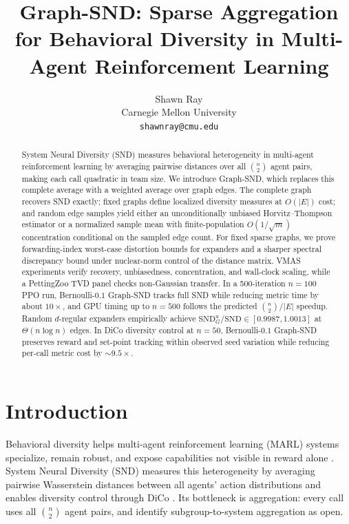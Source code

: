 \documentclass{article}
\title{Graph-SND: Sparse Aggregation for Behavioral Diversity in
Multi-Agent Reinforcement Learning}
\author{%
  Shawn Ray \\
  Carnegie Mellon University \\
  \texttt{shawnray@cmu.edu} \\
}
\theoremstyle{plain}
\theoremstyle{definition}
\theoremstyle{remark}
\newcommand{\SND}{\ensuremath{\mathrm{SND}}}
\newcommand{\SNDG}{\mathrm{SND}_{G}}
\begin{document}
\maketitle

\begin{abstract}
System Neural Diversity (SND) measures behavioral heterogeneity in
multi-agent reinforcement learning by averaging pairwise distances
over all $\binom{n}{2}$ agent pairs, making each call quadratic in
team size. We introduce Graph-SND, which replaces this complete average
with a weighted average over graph edges. The complete graph recovers
SND exactly; fixed graphs define localized diversity measures at
$O(|E|)$ cost; and random edge samples yield either an unconditionally
unbiased Horvitz--Thompson estimator or a normalized sample mean with
finite-population $O(1/\sqrt{m})$ concentration conditional on the
sampled edge count. For fixed sparse graphs, we prove forwarding-index
worst-case distortion bounds for expanders and a sharper spectral
discrepancy bound under nuclear-norm control of the distance matrix. VMAS
experiments verify recovery, unbiasedness, concentration, and wall-clock
scaling, while a PettingZoo TVD panel checks non-Gaussian transfer. In a
500-iteration $n=100$ PPO run,
Bernoulli-$0.1$ Graph-SND tracks full SND while reducing metric time by
about $10\times$, and GPU timing up to $n=500$ follows the predicted
$\binom{n}{2}/|E|$ speedup. Random $d$-regular expanders empirically
achieve $\SNDG^{\mathrm{u}}/\SND\in[0.9987,1.0013]$ at
$\Theta(n\log n)$ edges. In DiCo diversity control at $n=50$,
Bernoulli-$0.1$ Graph-SND preserves reward and set-point tracking within
observed seed variation while reducing per-call metric cost by
${\sim}9.5\times$.
\end{abstract}
\section{Introduction}
\label{sec:intro}

Behavioral diversity helps multi-agent reinforcement learning (MARL)
systems specialize, remain robust, and expose capabilities not visible in
reward alone \citep{bettini2023hetgppo,bettini2025snd}. System Neural
Diversity (SND) \citep{bettini2025snd} measures this heterogeneity by
averaging pairwise Wasserstein distances between all agents' action
distributions and enables diversity control through DiCo
\citep{bettini2024dico}. Its bottleneck is aggregation: every call uses
all $\binom{n}{2}$ agent pairs, and \citet[\S6]{bettini2025snd} identify
subgroup-to-system aggregation as open.
\end{document}
